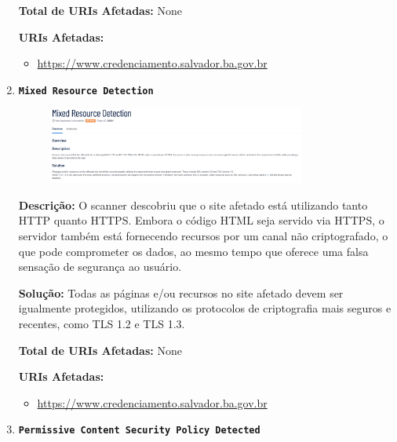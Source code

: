 \documentclass[a4paper,12pt]{article}
\begin{document}
\begin{enumerate}
\textbf{Total de URIs Afetadas:} None

\textbf{URIs Afetadas:}
\begin{itemize}
    \item \url{https://www.credenciamento.salvador.ba.gov.br}
\end{itemize}

\item \textbf{\texttt{Mixed Resource Detection}}

                        \begin{figure}[h!]
                        \centering
                        \includegraphics[width=0.8\textwidth]{assets/images-was/Vulnerabilidades Relacionadas a Configurações de Segurança HTTP E TLS/Mixed Resource Detection}
                        \end{figure}
                        \FloatBarrier
                        \textbf{Descrição:} O scanner descobriu que o site afetado está utilizando tanto HTTP quanto HTTPS. Embora o código HTML seja servido via HTTPS, o servidor também está fornecendo recursos por um canal não criptografado, o que pode comprometer os dados, ao mesmo tempo que oferece uma falsa sensação de segurança ao usuário.


\textbf{Solução:} Todas as páginas e/ou recursos no site afetado devem ser igualmente protegidos, utilizando os protocolos de criptografia mais seguros e recentes, como TLS 1.2 e TLS 1.3.

\textbf{Total de URIs Afetadas:} None

\textbf{URIs Afetadas:}
\begin{itemize}
    \item \url{https://www.credenciamento.salvador.ba.gov.br}
\end{itemize}

\item \textbf{\texttt{Permissive Content Security Policy Detected}}


\end{enumerate}
\end{document}
